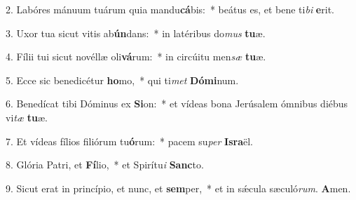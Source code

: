 2. Labóres mánuum tuárum quia mandu\textbf{cá}bis:~*  beátus es, et bene ti\textit{bi} \textbf{e}rit.\

3. Uxor tua sicut vitis ab\textbf{ún}dans:~*  in latéribus do\textit{mus} \textbf{tu}æ.\

4. Fílii tui sicut novéllæ oli\textbf{vá}rum:~*  in circúitu men\textit{sæ} \textbf{tu}æ.\

5. Ecce sic benedicétur \textbf{ho}mo,~*  qui ti\textit{met} \textbf{Dó}\textbf{mi}num.\

6. Benedícat tibi Dóminus ex \textbf{Si}on:~*  et vídeas bona Jerúsalem ómnibus diébus vi\textit{tæ} \textbf{tu}æ.\

7. Et vídeas fílios filiórum tu\textbf{ó}rum:~*  pacem su\textit{per} \textbf{Is}\textbf{ra}ël.\

8. Glória Patri, et \textbf{Fí}lio,~*  et Spirítu\textit{i} \textbf{Sanc}to.\

9. Sicut erat in princípio, et nunc, et \textbf{sem}per,~*  et in sǽcula sæculó\textit{rum}. \textbf{A}men.\

